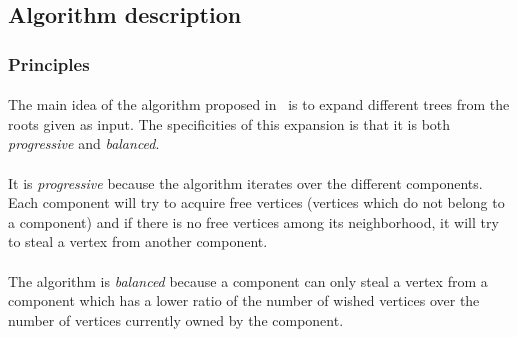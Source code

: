 
\subsection{Algorithm description}
\subsubsection{Principles}
\paragraph{}
The main idea of the algorithm proposed in~\cite{JS94} is to expand different
trees from the roots given as input. The specificities of this expansion is
that it is both {\em progressive} and {\em balanced}.
\paragraph{}
It is {\em progressive} because the algorithm iterates over the different
components. Each component will try to acquire free vertices (vertices which
do not belong to a component) and if there is no free vertices among its
neighborhood, it will try to steal a vertex from another component.
\paragraph{}
The algorithm is {\em balanced} because a component can only steal a vertex
from a component which has a lower ratio of the number of wished vertices over
the number of vertices currently owned by the component.
